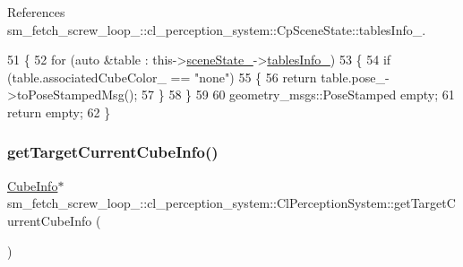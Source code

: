 References sm\+\_\+fetch\+\_\+screw\+\_\+loop\+\_\+::cl\+\_\+perception\+\_\+system\+::\+Cp\+Scene\+State\+::tables\+Info\+\_\+.


\begin{DoxyCode}
51             \{
52                 \textcolor{keywordflow}{for} (\textcolor{keyword}{auto} &table : this->\hyperlink{classsm__fetch__screw__loop__1_1_1cl__perception__system_1_1ClPerceptionSystem_a2a9472fe3838543666bd2eea5df0f2e6}{sceneState\_}->\hyperlink{classsm__fetch__screw__loop__1_1_1cl__perception__system_1_1CpSceneState_adc87f7a438a7030adfaa9e94f0e8f4e0}{tablesInfo\_})
53                 \{
54                     \textcolor{keywordflow}{if} (table.associatedCubeColor\_ == \textcolor{stringliteral}{"none"})
55                     \{
56                         \textcolor{keywordflow}{return} table.pose\_->toPoseStampedMsg();
57                     \}
58                 \}
59 
60                 geometry\_msgs::PoseStamped empty;
61                 \textcolor{keywordflow}{return} empty;
62             \}
\end{DoxyCode}
\mbox{\label{classsm__fetch__screw__loop__1_1_1cl__perception__system_1_1ClPerceptionSystem_a7db81d4aa99849818668b52aee431816}} 
\subsubsection{\texorpdfstring{get\+Target\+Current\+Cube\+Info()}{getTargetCurrentCubeInfo()}}
{\footnotesize\ttfamily \hyperlink{structsm__fetch__screw__loop__1_1_1cl__perception__system_1_1CubeInfo}{Cube\+Info}$\ast$ sm\+\_\+fetch\+\_\+screw\+\_\+loop\+\_\+::cl\+\_\+perception\+\_\+system\+::\+Cl\+Perception\+System\+::get\+Target\+Current\+Cube\+Info (\begin{DoxyParamCaption}{ }\end{DoxyParamCaption})\hspace{0.3cm}{\ttfamily [inline]}}



